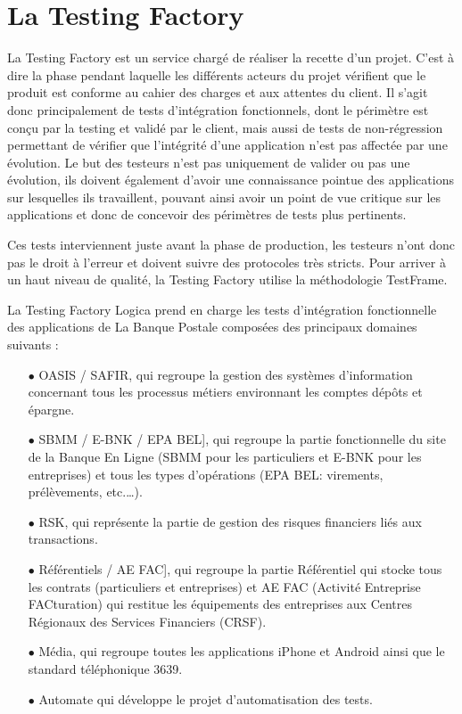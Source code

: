 \chapter{La Testing Factory}

La Testing Factory est un service chargé de réaliser la recette d'un projet. C'est à dire la phase pendant laquelle les différents acteurs du projet vérifient que le produit est conforme au cahier des charges et aux attentes du client. Il s'agit donc principalement de tests d'intégration fonctionnels, dont le périmètre est conçu par la testing et validé par le client, mais aussi de tests de non-régression permettant de vérifier que l'intégrité d'une application n'est pas affectée par une évolution.
Le but des testeurs n'est pas uniquement de valider ou pas une évolution, ils doivent également d'avoir une connaissance pointue des applications sur lesquelles ils travaillent, pouvant ainsi avoir un point de vue critique sur les applications et donc de concevoir des périmètres de tests plus pertinents.

Ces tests interviennent juste avant la phase de production, les testeurs n'ont donc pas le droit à l'erreur et doivent suivre des protocoles très stricts. Pour arriver à un haut niveau de qualité, la Testing Factory utilise la méthodologie TestFrame.

La Testing Factory Logica prend en charge les tests d’intégration fonctionnelle des applications de La Banque Postale composées des principaux domaines suivants :
\begin{itemize}
\item[$\bullet$] OASIS / SAFIR, qui regroupe la gestion des systèmes d’information concernant tous les processus métiers environnant les comptes dépôts et épargne.
\item[$\bullet$] SBMM / E-BNK / EPA BEL], qui regroupe la partie fonctionnelle du site de la Banque En Ligne (SBMM pour les particuliers et E-BNK pour les entreprises) et tous les types d’opérations (EPA BEL: virements, prélèvements, etc.…).
\item[$\bullet$] RSK, qui représente la partie de gestion des risques financiers liés aux transactions.
\item[$\bullet$] Référentiels / AE FAC], qui regroupe la partie Référentiel qui stocke tous les contrats (particuliers et entreprises) et AE FAC (Activité Entreprise FACturation) qui restitue les équipements des entreprises aux Centres Régionaux des Services Financiers (CRSF).
\item[$\bullet$] Média, qui regroupe toutes les applications iPhone et Android ainsi que le standard téléphonique 3639.
\item[$\bullet$] Automate qui développe le projet d’automatisation des tests.
\end{itemize}

